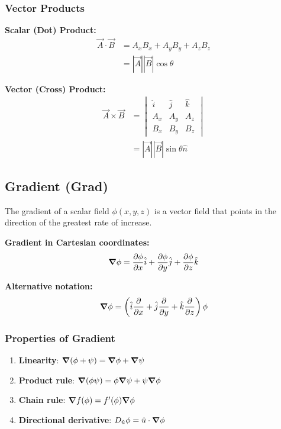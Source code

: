 \documentclass[12pt,a4paper]{article}
\begin{document}
\subsubsection{Vector Products}
\begin{formulabox}
\textbf{Scalar (Dot) Product:}
\begin{align}
\vec{A} \cdot \vec{B} &= A_x B_x + A_y B_y + A_z B_z \\
&= |\vec{A}||\vec{B}|\cos\theta
\end{align}

\textbf{Vector (Cross) Product:}
\begin{align}
\vec{A} \times \vec{B} &= \begin{vmatrix}
\hat{i} & \hat{j} & \hat{k} \\
A_x & A_y & A_z \\
B_x & B_y & B_z
\end{vmatrix} \\
&= |\vec{A}||\vec{B}|\sin\theta \hat{n}
\end{align}
\end{formulabox}

\subsection{Gradient (Grad)}
The gradient of a scalar field $\phi(x,y,z)$ is a vector field that points in the direction of the greatest rate of increase.

\begin{formulabox}
\textbf{Gradient in Cartesian coordinates:}
\begin{equation}
\grad \phi = \pdv{\phi}{x}\hat{i} + \pdv{\phi}{y}\hat{j} + \pdv{\phi}{z}\hat{k}
\end{equation}

\textbf{Alternative notation:}
\begin{equation}
\grad \phi = \left(\hat{i}\pdv{}{x} + \hat{j}\pdv{}{y} + \hat{k}\pdv{}{z}\right)\phi
\end{equation}
\end{formulabox}

\subsubsection{Properties of Gradient}
\begin{enumerate}
    \item \textbf{Linearity}: $\grad(\phi + \psi) = \grad\phi + \grad\psi$
    \item \textbf{Product rule}: $\grad(\phi\psi) = \phi\grad\psi + \psi\grad\phi$
    \item \textbf{Chain rule}: $\grad f(\phi) = f'(\phi)\grad\phi$
    \item \textbf{Directional derivative}: $D_{\hat{u}}\phi = \hat{u} \cdot \grad\phi$
\end{enumerate}
\end{document}
